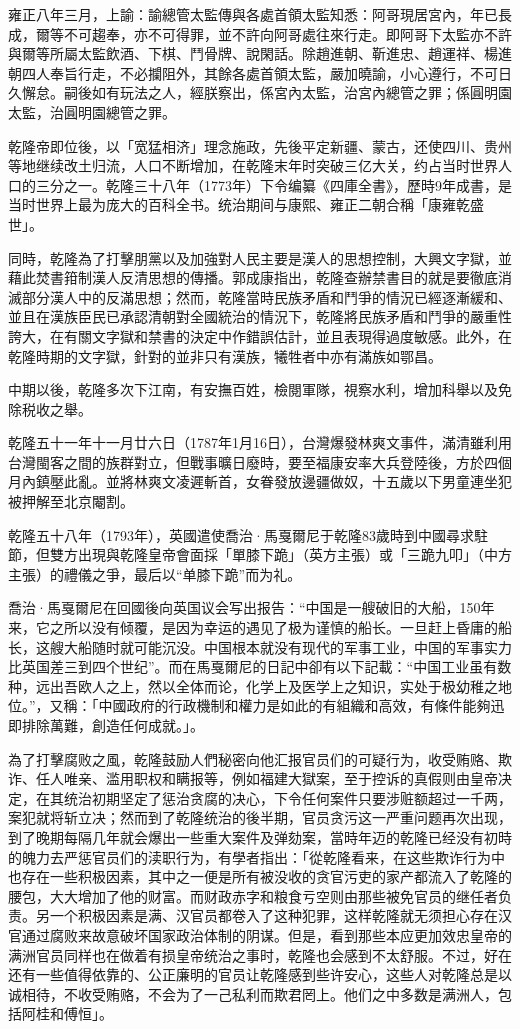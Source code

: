 雍正八年三月，上諭：諭總管太監傳與各處首領太監知悉：阿哥現居宮內，年已長成，爾等不可趨奉，亦不可得罪，並不許向阿哥處往來行走。即阿哥下太監亦不許與爾等所屬太監飲酒、下棋、鬥骨牌、說閑話。除趙進朝、靳進忠、趙運祥、楊進朝四人奉旨行走，不必攔阻外，其餘各處首領太監，嚴加曉諭，小心遵行，不可日久懈怠。嗣後如有玩法之人，經朕察出，係宮內太監，治宮內總管之罪；係圓明園太監，治圓明園總管之罪。

乾隆帝即位後，以「宽猛相济」理念施政，先後平定新疆、蒙古，还使四川、贵州等地继续改土归流，人口不断增加，在乾隆末年时突破三亿大关，约占当时世界人口的三分之一。乾隆三十八年（1773年）下令编纂《四庫全書》，歷時9年成書，是当时世界上最为庞大的百科全书。统治期间与康熙、雍正二朝合稱「康雍乾盛世」。

同時，乾隆為了打擊朋黨以及加強對人民主要是漢人的思想控制，大興文字獄，並藉此焚書箝制漢人反清思想的傳播。郭成康指出，乾隆查辦禁書目的就是要徹底消滅部分漢人中的反滿思想；然而，乾隆當時民族矛盾和鬥爭的情況已經逐漸緩和、並且在漢族臣民已承認清朝對全國統治的情況下，乾隆將民族矛盾和鬥爭的嚴重性誇大，在有關文字獄和禁書的決定中作錯誤估計，並且表現得過度敏感。此外，在乾隆時期的文字獄，針對的並非只有漢族，犧牲者中亦有滿族如鄂昌。

中期以後，乾隆多次下江南，有安撫百姓，檢閱軍隊，視察水利，增加科舉以及免除税收之舉。

乾隆五十一年十一月廿六日（1787年1月16日），台灣爆發林爽文事件，滿清雖利用台灣閩客之間的族群對立，但戰事曠日廢時，要至福康安率大兵登陸後，方於四個月內鎮壓此亂。並將林爽文凌遲斬首，女眷發放邊疆做奴，十五歲以下男童連坐犯被押解至北京閹割。

乾隆五十八年（1793年），英國遣使喬治·馬戛爾尼于乾隆83歲時到中國尋求駐節，但雙方出現與乾隆皇帝會面採「單膝下跪」（英方主張）或「三跪九叩」（中方主張）的禮儀之爭，最后以“单膝下跪”而为礼。

喬治·馬戛爾尼在回國後向英国议会写出报告：“中国是一艘破旧的大船，150年来，它之所以没有倾覆，是因为幸运的遇见了极为谨慎的船长。一旦赶上昏庸的船长，这艘大船随时就可能沉没。中国根本就没有现代的军事工业，中国的军事实力比英国差三到四个世纪”。而在馬戛爾尼的日記中卻有以下記載：“中国工业虽有数种，远出吾欧人之上，然以全体而论，化学上及医学上之知识，实处于极幼稚之地位。”，又稱：「中國政府的行政機制和權力是如此的有組織和高效，有條件能夠迅即排除萬難，創造任何成就。」。

為了打擊腐败之風，乾隆鼓励人們秘密向他汇报官员们的可疑行为，收受贿赂、欺诈、任人唯亲、滥用职权和瞒报等，例如福建大獄案，至于控诉的真假则由皇帝决定，在其统治初期坚定了惩治贪腐的决心，下令任何案件只要涉赃额超过一千两，案犯就将斩立决；然而到了乾隆统治的後半期，官员贪污这一严重问题再次出现，到了晚期每隔几年就会爆出一些重大案件及弹劾案，當時年迈的乾隆已经没有初時的魄力去严惩官员们的渎职行为，有學者指出：「從乾隆看来，在这些欺诈行为中也存在一些积极因素，其中之一便是所有被没收的贪官污吏的家产都流入了乾隆的腰包，大大增加了他的财富。而财政赤字和粮食亏空则由那些被免官员的继任者负责。另一个积极因素是满、汉官员都卷入了这种犯罪，这样乾隆就无须担心存在汉官通过腐败来故意破坏国家政治体制的阴谋。但是，看到那些本应更加效忠皇帝的满洲官员同样也在做着有损皇帝统治之事时，乾隆也会感到不太舒服。不过，好在还有一些值得依靠的、公正廉明的官员让乾隆感到些许安心，这些人对乾隆总是以诚相待，不收受贿赂，不会为了一己私利而欺君罔上。他们之中多数是满洲人，包括阿桂和傅恒」。

